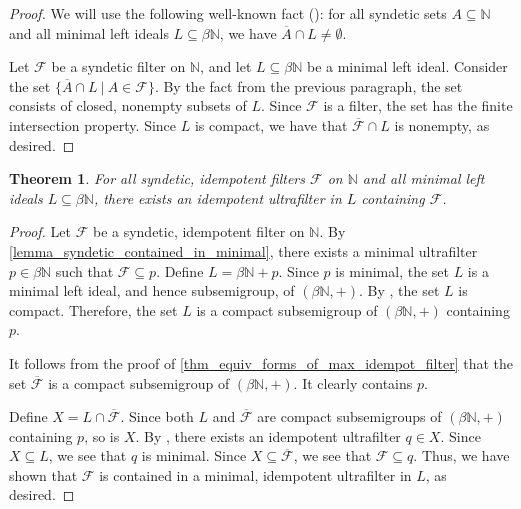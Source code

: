 \documentclass[letter,11pt]{article}
\theoremstyle{plain}
\newtheorem{theorem}{Theorem}
\theoremstyle{definition}
\theoremstyle{plain}
\theoremstyle{plain}
\numberwithin{equation}{section}
\newcommand{\N}{\mathbb{N}}
\newcommand{\filter}{\mathscr{F}}
\begin{document}
\begin{proof}
    We will use the following well-known fact (\cite[Thm. 4.48]{hindman_strauss_book_2012}): for all syndetic sets $A \subseteq \N$ and all minimal left ideals $L \subseteq \beta \N$, we have $\overline{A} \cap L \neq \emptyset$.

    Let $\filter$ be a syndetic filter on $\N$, and let $L \subseteq \beta \N$ be a minimal left ideal.  Consider the set $\{\overline{A} \cap L \ | \ A \in \filter\}$.  By the fact from the previous paragraph, the set consists of closed, nonempty subsets of $L$.  Since $\filter$ is a filter, the set has the finite intersection property.  Since $L$ is compact, we have that $\overline{\filter} \cap L$ is nonempty, as desired.
\end{proof}


\begin{theorem}
\label{thm_sifs_are_contained_in_idempotents}
    For all syndetic, idempotent filters $\filter$ on $\N$ and all minimal left ideals $L \subseteq \beta \N$, there exists an idempotent ultrafilter in $L$ containing $\filter$.
\end{theorem}

\begin{proof}
    Let $\filter$ be a syndetic, idempotent filter on $\N$. By \cref{lemma_syndetic_contained_in_minimal}, there exists a minimal ultrafilter $p \in \beta \N$ such that $\filter \subseteq p$.  Define $L = \beta \N + p$.  Since $p$ is minimal, the set $L$ is a minimal left ideal, and hence subsemigroup, of $(\beta \N, +)$.  By \cite[Thm. 2.6]{hindman_strauss_book_2012}, the set $L$ is compact.  Therefore, the set $L$ is a compact subsemigroup of $(\beta \N, +)$ containing $p$.

    It follows from the proof of \cref{thm_equiv_forms_of_max_idempot_filter} that the set $\overline{\filter}$ is a compact subsemigroup of $(\beta \N, +)$.  It clearly contains $p$.

    Define $X = L \cap \overline{\filter}$.  Since both $L$ and $\overline{\filter}$ are compact subsemigroups of $(\beta \N, +)$ containing $p$, so is $X$.  By \cite[Thm. 2.5]{hindman_strauss_book_2012}, there exists an idempotent ultrafilter $q \in X$.  Since $X \subseteq L$, we see that $q$ is minimal.  Since $X \subseteq \overline{\filter}$, we see that $\filter \subseteq q$.  Thus, we have shown that $\filter$ is contained in a minimal, idempotent ultrafilter in $L$, as desired.
\end{proof}
\end{document}
